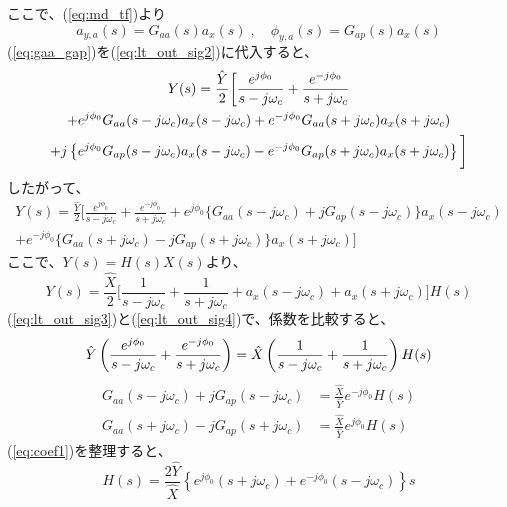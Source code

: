 \documentclass[book]{jlreq}
\begin{document}
%
ここで、(\ref{eq:md_tf})より
%
\begin{equation}
    a_{y, a}(s) = G_{aa}(s) a_x(s)\; , \quad \phi_{y, a}(s) = G_{ap}(s)a_x(s)
    \label{eq:gaa_gap}
\end{equation}
%
(\ref{eq:gaa_gap})を(\ref{eq:lt_out_sig2})に代入すると、
%
\begin{multline}
    Y(s) = \frac{\hat{Y}}{2}\biggr [\frac{e^{j\phi_0}}{s-j\omega_c}+\frac{e^{-j\phi_0}}{s+j\omega_c} \\
        + e^{j\phi_0}G_{aa}(s-j\omega_c)a_x(s - j\omega_c) + e^{-j\phi_0}G_{aa}(s+j\omega_c)a_x(s+j\omega_c) \\
        + j\left \{e^{j\phi_0}G_{ap}(s-j\omega_c)a_x(s-j\omega_c) 
        - e^{-j\phi_0}G_{ap}(s+j\omega_c)a_x(s+j\omega_c) \right \} \biggl ]\notag 
\end{multline}
%
したがって、
%
\begin{multline}
    Y(s) = \frac{\hat{Y}}{2}\biggr [\frac{e^{j\phi_0}}{s-j\omega_c}+\frac{e^{-j\phi_0}}{s+j\omega_c} 
    + e^{j\phi_0}\{G_{aa}(s-j\omega_c)+j G_{ap}(s-j\omega_c)\}a_x(s-j\omega_c) \\
    + e^{-j\phi_0}\{G_{aa}(s+j\omega_c)- j G_{ap}(s+j\omega_c)\}a_x(s+j\omega_c)\biggl ]
    \label{eq:lt_out_sig3}
\end{multline}
%
ここで、$Y(s) = H(s) X(s)$より、
%
\begin{equation}
    Y(s) = \frac{\hat{X}}{2} \biggl [\frac{1}{s-j\omega_c}+\frac{1}{s+j\omega_c} + a_x(s - j\omega_c) + a_x(s+j\omega_c)  \biggr ] H(s)
    \label{eq:lt_out_sig4}
\end{equation}
%
(\ref{eq:lt_out_sig3})と(\ref{eq:lt_out_sig4})で、係数を比較すると、
%
\begin{equation} 
    \hat{Y}\left(\frac{e^{j\phi_0}}{s-j\omega_c} + \frac{e^{-j\phi_0}}{s+j\omega_c} \right) =
    \hat{X}\left(\frac{1}{s-j\omega_c} + \frac{1}{s+j\omega_c}  \right) H(s) \\
    \label{eq:coef1}
\end{equation}
%
\begin{equation}
    \begin{split}
        G_{aa}(s-j\omega_c) + j G_{ap}(s-j\omega_c) &= \frac{\hat{X}}{\hat{Y}}e^{-j\phi_0}H(s) \\
        G_{aa}(s+j\omega_c) - j G_{ap}(s+j\omega_c) &= \frac{\hat{X}}{\hat{Y}}e^{j\phi_0}H(s) 
    \end{split}
\end{equation}
%
(\ref{eq:coef1})を整理すると、
%
\begin{equation}
    H(s) = \frac{2\hat{Y}}{\hat{X}}\left\{e^{j\phi_0}(s+j\omega_c)+e^{-j\phi_0}(s-j\omega_c)\right\} s
\end{equation}
\end{document}
